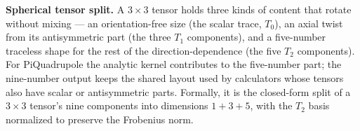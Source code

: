 \documentclass[11pt]{article}
\begin{document}
\textbf{Spherical tensor split.} A \(3\times3\) tensor holds three kinds of
content that rotate without mixing --- an orientation-free size (the scalar
trace, \(T_0\)), an axial twist from its antisymmetric part (the three \(T_1\)
components), and a five-number traceless shape for the rest of the
direction-dependence (the five \(T_2\) components). For
PiQuadrupole the analytic kernel contributes to the five-number part; the
nine-number output keeps the shared layout used by calculators whose tensors
also have scalar or antisymmetric parts. Formally, it is the closed-form split
of a \(3\times3\) tensor's nine components into dimensions \(1+3+5\), with the
\(T_2\) basis normalized to preserve the Frobenius norm.
\end{document}
